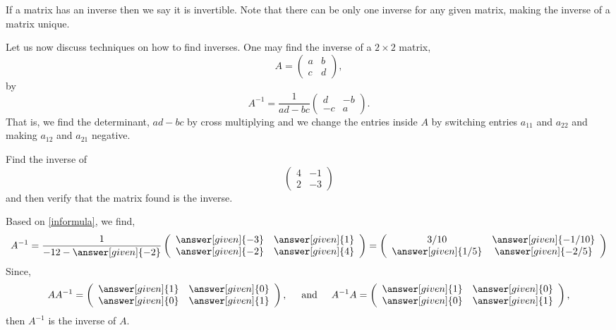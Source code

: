 \documentclass{ximera}
\begin{document}
If a matrix has an inverse then we say it is invertible. Note that there can be only one inverse for any given matrix, making the inverse of a matrix unique.

Let us now discuss techniques on how to find inverses. One may find the inverse of a $2\times 2$ matrix,
 \[A= \left(\begin{array}{cc}
  a & b  \\
  c &  d
\end{array}\right),
\]
by
\begin{equation}\label{informula}
A^{-1}=  \frac{1}{ad-bc} \left(\begin{array}{cc}
  d & -b  \\
  -c &  a
\end{array}\right).
\end{equation}
That is, we find the determinant, $ad-bc$ by cross multiplying and we change the entries inside $A$ by switching entries $a_{11}$ and $a_{22}$ and making $a_{12}$ and $a_{21}$ negative.

\begin{example}
 Find the inverse of
\[ \left(\begin{array}{cc}
  4 & -1 \\
  2 & -3
\end{array}\right)
\]
and then verify that the matrix found is the inverse.

\begin{prompt}
Based on \eqref{informula}, we find,
\[
A^{-1}=  \frac{1}{-12-\answer[given]{-2}} \left(\begin{array}{cc}
  \answer[given]{-3} &  \answer[given]{1} \\
  \answer[given]{-2} &  \answer[given]{4}
\end{array}\right)= \left(\begin{array}{cc}
  3/10 &  \answer[given]{-1/10} \\
  \answer[given]{1/5} &  \answer[given]{-2/5}
\end{array}\right)
\]
Since,
\[
AA^{-1}= \left(\begin{array}{cc}
  \answer[given]{1} &  \answer[given]{0} \\
  \answer[given]{0} &  \answer[given]{1}
\end{array}\right), \hspace{.5cm} \text{and} \hspace{.5cm}
A^{-1}A= \left(\begin{array}{cc}
  \answer[given]{1} &  \answer[given]{0} \\
  \answer[given]{0} &  \answer[given]{1}
\end{array}\right),
\]
then $A^{-1}$ is the inverse of $A$.
\end{prompt}
\end{example}
\end{document}
